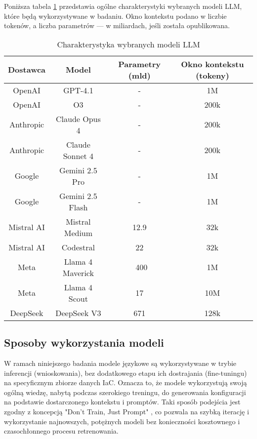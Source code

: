 Poniższa tabela \ref{tab:llm-characteristic} przedstawia ogólne charakterystyki wybranych modeli LLM, które będą wykorzystywane w badaniu. Okno kontekstu podano w liczbie tokenów, a liczba parametrów — w miliardach, jeśli została opublikowana.

\newpage

\begin{table}[!h] \centering
\caption{Charakterystyka wybranych modeli LLM}
\label{tab:llm-characteristic}
\begin{tabular}{| c | c | c | c |} \hline
\textbf{Dostawca} & \textbf{Model} & \textbf{Parametry (mld)} & \textbf{Okno kontekstu (tokeny)} \\ \hline\hline
OpenAI & GPT-4.1 & - & 1M \\ \hline
OpenAI & O3 & - & 200k \\ \hline
Anthropic & Claude Opus 4 & - & 200k \\ \hline
Anthropic & Claude Sonnet 4 & - & 200k \\ \hline
Google & Gemini 2.5 Pro & - & 1M \\ \hline
Google & Gemini 2.5 Flash & - & 1M \\ \hline
Mistral AI & Mistral Medium & 12.9 & 32k \\ \hline
Mistral AI & Codestral & 22 & 32k \\ \hline
Meta & Llama 4 Maverick & ~400 & 1M \\ \hline
Meta & Llama 4 Scout & 17 & 10M \\ \hline
DeepSeek & DeepSeek V3 & 671 & 128k \\ \hline
\end{tabular}
\end{table}

\subsection{Sposoby wykorzystania modeli}

W ramach niniejszego badania modele językowe są wykorzystywane w trybie inferencji (wnioskowania), bez dodatkowego etapu ich dostrajania (fine-tuningu) na specyficznym zbiorze danych IaC. Oznacza to, że modele wykorzystują swoją ogólną wiedzę, nabytą podczas szerokiego treningu, do generowania konfiguracji na podstawie dostarczonego kontekstu i promptów. Taki sposób podejścia jest zgodny z koncepcją "Don't Train, Just Prompt" \cite{kratzke_dont_2024}, co pozwala na szybką iterację i wykorzystanie najnowszych, potężnych modeli bez konieczności kosztownego i czasochłonnego procesu retrenowania.

